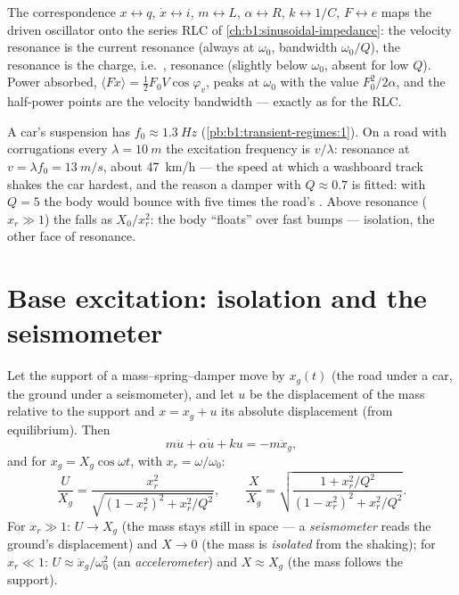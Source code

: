 \begin{remark}\label{rem:b1:oscillators-resonance:analogy}
The correspondence $x \leftrightarrow q$, $\dot x \leftrightarrow i$,
$m \leftrightarrow L$, $\alpha \leftrightarrow R$, $k \leftrightarrow 1/C$,
$F \leftrightarrow e$ maps the driven oscillator onto the series RLC of
\cref{ch:b1:sinusoidal-impedance}: the velocity resonance is the current
resonance (always at $\omega_0$, bandwidth $\omega_0/Q$), the 
resonance is the charge, i.e.\ , resonance (slightly
below $\omega_0$, absent for low $Q$). Power absorbed, $\langle F\dot x\rangle
= \tfrac12 F_0V\cos\varphi_v$, peaks at $\omega_0$ with the value $F_0^2/2\alpha$,
and the half-power points are the velocity bandwidth --- exactly as for
the RLC.
\end{remark}

\begin{example}\label{ex:b1:oscillators-resonance:road}
A car's suspension has $f_0 \approx \qty{1.3}{Hz}$ (\cref{pb:b1:transient-regimes:1}).
On a road with corrugations every $\lambda = \qty{10}{m}$ the excitation
frequency is $v/\lambda$: resonance at $v = \lambda f_0 = \qty{13}{m/s}$,
about \qty{47}{km/h} --- the speed at which a washboard track shakes the
car hardest, and the reason a damper with $Q \approx 0.7$ is fitted:
with $Q = 5$ the body would bounce with five times the road's
. Above resonance ($x_r \gg 1$) the  falls as
$X_0/x_r^2$: the body ``floats'' over fast bumps --- isolation, the other
face of resonance.
\end{example}

\section{Base excitation: isolation and the seismometer}

\begin{proposition}\label{prop:b1:oscillators-resonance:base}
Let the support of a mass--spring--damper move by $x_g(t)$ (the road
under a car, the ground under a seismometer), and let $u$ be the
displacement of the mass relative to the support and $x = x_g + u$ its
absolute displacement (from equilibrium). Then
\[
m\ddot u + \alpha\dot u + ku = -m\ddot x_g ,
\]
and for $x_g = X_g\cos\omega t$, with $x_r = \omega/\omega_0$:
\[
\frac{U}{X_g} = \frac{x_r^2}{\sqrt{(1 - x_r^2)^2 + x_r^2/Q^2}},
\qquad
\frac{X}{X_g} = \sqrt{\frac{1 + x_r^2/Q^2}{(1 - x_r^2)^2 + x_r^2/Q^2}} .
\]
For $x_r \gg 1$: $U \to X_g$ (the mass stays still in space --- a
\emph{seismometer} reads the ground's displacement) and $X \to 0$ (the
mass is \emph{isolated} from the shaking); for $x_r \ll 1$: $U \approx
\ddot x_g/\omega_0^2$ (an \emph{accelerometer}) and $X \approx X_g$ (the mass
follows the support).
\end{proposition}

